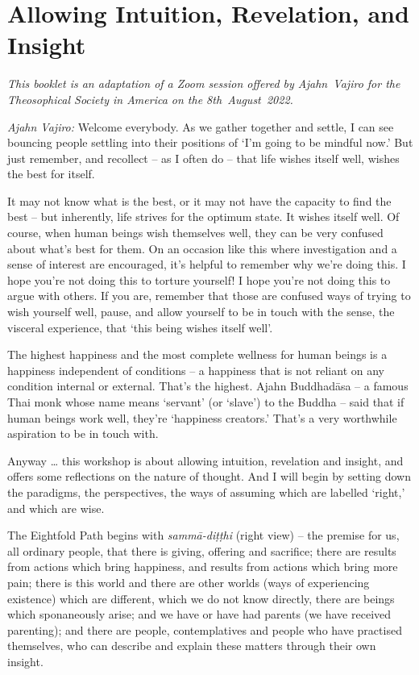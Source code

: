 \chapter{Allowing Intuition, Revelation, and Insight}

{\centering
\begin{minipage}{0.8\linewidth}%
\centering\itshape
This booklet is an adaptation of a Zoom session offered by Ajahn~Vajiro
for the Theosophical Society in America on the 8th~August~2022.
\end{minipage}
\par}


\bigskip

\emph{Ajahn Vajiro:} Welcome everybody. As we gather together and settle, I can
see bouncing people settling into their positions of `I'm going to be mindful
now.' But just remember, and recollect -- as I often do -- that life wishes
itself well, wishes the best for itself.

It may not know what is the best, or it may not have the capacity to find the
best -- but inherently, life strives for the optimum state. It wishes itself
well. Of course, when human beings wish themselves well, they can be very
confused about what's best for them. On an occasion like this where
investigation and a sense of interest are encouraged, it's helpful to remember
why we're doing this. I hope you're not doing this to torture yourself! I hope
you're not doing this to argue with others. If you are, remember that those
are confused ways of trying to wish yourself well, pause, and allow yourself to
be in touch with the sense, the visceral experience, that `this being wishes
itself well'.

The highest happiness and the most complete wellness for human beings is a
happiness independent of conditions -- a happiness that is not reliant on any
condition internal or external. That's the highest. Ajahn Buddhadāsa -- a famous
Thai monk whose name means `servant' (or `slave') to the Buddha -- said that if
human beings work well, they're `happiness creators.' That's a very worthwhile
aspiration to be in touch with.

Anyway \ldots{} this workshop is about allowing intuition, revelation and
insight, and offers some reflections on the nature of thought. And I will begin
by setting down the paradigms, the perspectives, the ways of assuming which are
labelled `right,' and which are wise.

The Eightfold Path begins with \emph{sammā-diṭṭhi} (right view) -- the premise
for us, all ordinary people, that there is giving, offering and sacrifice; there
are results from actions which bring happiness, and results from actions which
bring more pain; there is this world and there are other worlds (ways of
experiencing existence) which are different, which we do not know directly, there are beings which sponaneously arise; and
we have or have had parents (we have received parenting); and there are people, contemplatives and people who
have practised themselves, who can describe and explain these matters through
their own insight.

